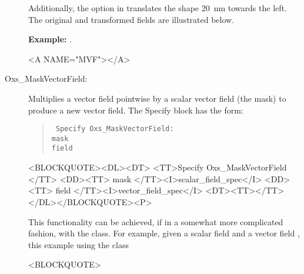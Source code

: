 \begin{description}
Additionally, the  option in  translates the
shape 20~nm towards the left.  The original and transformed fields are
illustrated below.
%

\textbf{Example:} .

\begin{rawhtml}<A NAME="MVF"></A>\end{rawhtml}%
%
\item[Oxs\_MaskVectorField:\label{item:MaskVectorField}]
Multiplies a vector field pointwise by a scalar vector field (the mask)
to produce a new vector field.  The Specify block has the form:
\begin{latexonly}
\begin{quote}\tt
Specify Oxs\_MaskVectorField: \ocb\\
 \bi mask  \\
 \bi field \\
\ccb
\end{quote}
\end{latexonly}
\begin{rawhtml}<BLOCKQUOTE><DL><DT>
<TT>Specify Oxs_MaskVectorField {</TT>
<DD><TT> mask </TT><I>scalar_field_spec</I>
<DD><TT> field </TT><I>vector_field_spec</I>
<DT><TT>}</TT></DL></BLOCKQUOTE><P>
\end{rawhtml}
This functionality can be achieved, if in a somewhat more complicated
fashion, with the
class.  For example, given a scalar field  and a vector field
, this example using the  class
\begin{rawhtml}<BLOCKQUOTE>\end{rawhtml}
\begin{quote}

\end{quote}
\end{description}

